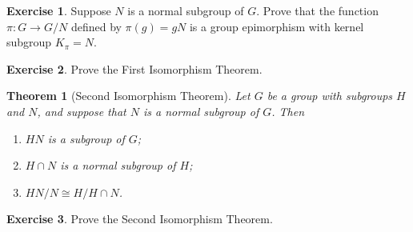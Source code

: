 \documentclass[12pt]{article}
\theoremstyle{plain}
\newtheorem{theorem} {Theorem}
\newtheorem{lemma}[theorem]{Lemma}
\theoremstyle{definition}
\newtheorem{exercise}{Exercise}
\theoremstyle{remark}
\theoremstyle{remark}
\numberwithin{theorem}{section}
\numberwithin{equation}{section}
\newcommand{\<}{\ensuremath{\langle}}
\renewcommand{\>}{\ensuremath{\rangle}}
\begin{document}



  \begin{exercise}
  Suppose $N$ is a normal subgroup of $G$. Prove that the function 
  $\pi: G \rightarrow G/N$ defined by $\pi(g) = gN$ is a group epimorphism with
  kernel subgroup $K_\pi = N$. 
  \end{exercise}

  \begin{exercise}
    Prove the First Isomorphism Theorem.
  \end{exercise}

  \begin{theorem}[Second Isomorphism Theorem]
    Let $G$ be a group with subgroups $H$ and $N$, and suppose that $N$ is a
    normal subgroup of $G$. Then 
    \begin{enumerate}
    \item $H N$ is a subgroup of $G$;
    \item $H\cap N$ is a normal subgroup of $H$;
    \item $HN/N \cong H/H\cap N$.
    \end{enumerate}
  \end{theorem}

  \begin{exercise}
    Prove the Second Isomorphism Theorem.
  \end{exercise}
\end{document}
